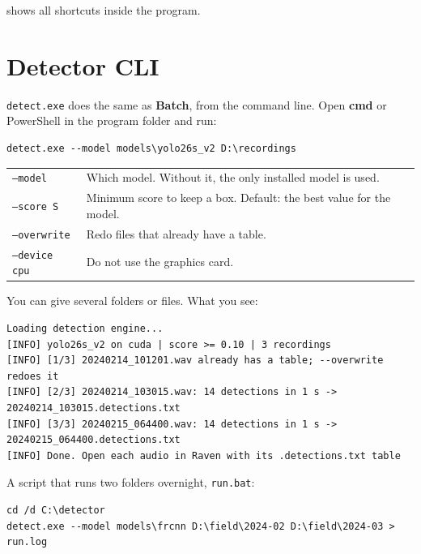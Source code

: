 \documentclass[11pt,a4paper]{article}
\newcommand{\detect}{\texttt{detect.exe}}
\newcommand{\ui}[1]{\textsf{\textbf{#1}}}
\newcommand{\file}[1]{\texttt{#1}}
\let\menukeyskeys\keys
\renewcommand{\keys}[1]{\mbox{\menukeyskeys{#1}}}
\begin{document}
 shows all shortcuts inside the program.

\section{Detector CLI}
\label{sec:cli}

\detect{} does the same as \ui{Batch}, from the command line. Open \ui{cmd} or PowerShell in
the program folder and run:

\begin{Verbatim}[frame=single,fontsize=\small]
detect.exe --model models\yolo26s_v2 D:\recordings
\end{Verbatim}

\begin{center}
\begin{tabularx}{\textwidth}{@{}lX@{}}
  \toprule
  \file{--model} & Which model. Without it, the only installed model is used. \\
  \file{--score S} & Minimum score to keep a box. Default: the best value for the model. \\
  \file{--overwrite} & Redo files that already have a table. \\
  \file{--device cpu} & Do not use the graphics card. \\
  \bottomrule
\end{tabularx}
\end{center}

You can give several folders or files. What you see:

\begin{Verbatim}[frame=single,fontsize=\footnotesize]
Loading detection engine...
[INFO] yolo26s_v2 on cuda | score >= 0.10 | 3 recordings
[INFO] [1/3] 20240214_101201.wav already has a table; --overwrite redoes it
[INFO] [2/3] 20240214_103015.wav: 14 detections in 1 s -> 20240214_103015.detections.txt
[INFO] [3/3] 20240215_064400.wav: 14 detections in 1 s -> 20240215_064400.detections.txt
[INFO] Done. Open each audio in Raven with its .detections.txt table
\end{Verbatim}

A script that runs two folders overnight, \file{run.bat}:

\begin{Verbatim}[frame=single,fontsize=\small]
cd /d C:\detector
detect.exe --model models\frcnn D:\field\2024-02 D:\field\2024-03 > run.log
\end{Verbatim}
\end{document}
